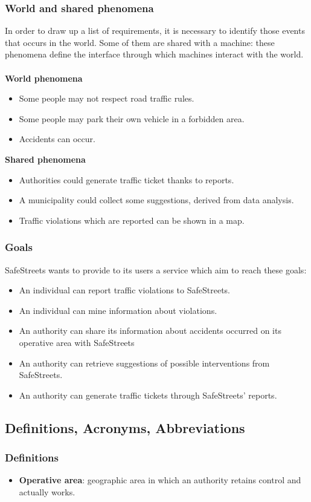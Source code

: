\documentclass{article}
\newcommand\goal[1]{\item[{[G#1]}] }
\begin{document}
			\subsubsection{World and shared phenomena}
				In order to draw up a list of requirements, it is necessary to identify those events that occurs in the world. Some of them are shared with a machine: these phenomena define the interface through which machines interact with the world.\\\\				
				\textbf{World phenomena}
				\begin{itemize}
					\item Some people may not respect road traffic rules.
					\item Some people may park their own vehicle in a forbidden area.
					\item Accidents can occur.
				\end{itemize}
				\textbf{Shared phenomena}
				\begin{itemize}
					\item Authorities could generate traffic ticket thanks to reports. 
					\item A municipality could collect some suggestions, derived from data analysis.
					\item Traffic violations which are reported can be shown in a map.
				\end{itemize}
			\subsubsection{Goals}
				SafeStreets wants to provide to its users a service which aim to reach these goals:
				\begin{itemize}
					\goal{1}An individual can report traffic violations to SafeStreets.
					\goal{2}An individual can mine information about violations.					
					\goal{3}An authority can share its information about accidents occurred on its operative area with SafeStreets
					\goal{4}An authority can retrieve suggestions of possible interventions from SafeStreets.
					\goal{5}An authority can generate traffic tickets through SafeStreets' reports.
				\end{itemize}
				
				
		\subsection{Definitions, Acronyms, Abbreviations}
			\subsubsection{Definitions}
				\begin{itemize}
					\item \textbf{Operative area}: geographic area in which an authority retains  control and actually works.
				\end{itemize}
\end{document}
